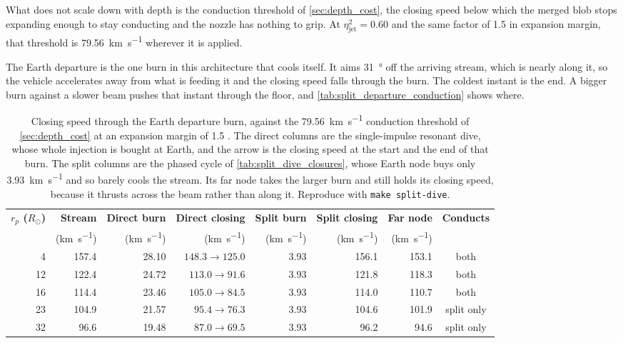 \documentclass{article}
\begin{document}
What does not scale down with depth is the conduction threshold of \autoref{sec:depth_cost}, the closing speed below which the merged blob stops expanding enough to stay conducting and the nozzle has nothing to grip. At $\eta_{\mathrm{jet}}^2 = 0.60$ and the same factor of 1.5 in expansion margin, that threshold is \SI{79.56}{\kilo\meter\per\second} wherever it is applied.

The Earth departure is the one burn in this architecture that cools itself. It aims \SI{31}{\degree} off the arriving stream, which is nearly along it, so the vehicle accelerates away from what is feeding it and the closing speed falls through the burn. The coldest instant is the end. A bigger burn against a slower beam pushes that instant through the floor, and \autoref{tab:split_departure_conduction} shows where.

\begin{table}[!htpb]
    \centering
    \caption{Closing speed through the Earth departure burn, against the \SI{79.56}{\kilo\meter\per\second} conduction threshold of \autoref{sec:depth_cost} at an expansion margin of 1.5 \cite{Katz_aim_is_all_you_need_2025}. The direct columns are the single-impulse resonant dive, whose whole injection is bought at Earth, and the arrow is the closing speed at the start and the end of that burn. The split columns are the phased cycle of \autoref{tab:split_dive_closures}, whose Earth node buys only \SI{3.93}{\kilo\meter\per\second} and so barely cools the stream. Its far node takes the larger burn and still holds its closing speed, because it thrusts across the beam rather than along it. Reproduce with \texttt{make split-dive}.}
    \label{tab:split_departure_conduction}
    \begin{tabular}{|r|r|r|r|r|r|r|c|}\hline
        \textbf{$r_p$ ($R_\odot$)} & \textbf{Stream} & \textbf{Direct burn} & \textbf{Direct closing} & \textbf{Split burn} & \textbf{Split closing} & \textbf{Far node} & \textbf{Conducts} \\
        & (\si{\kilo\meter\per\second}) & (\si{\kilo\meter\per\second}) & (\si{\kilo\meter\per\second}) & (\si{\kilo\meter\per\second}) & (\si{\kilo\meter\per\second}) & (\si{\kilo\meter\per\second}) & \\\hline
        4 & 157.4 & 28.10 & $148.3 \rightarrow 125.0$ & 3.93 & 156.1 & 153.1 & both \\\hline
        12 & 122.4 & 24.72 & $113.0 \rightarrow 91.6$ & 3.93 & 121.8 & 118.3 & both \\\hline
        16 & 114.4 & 23.46 & $105.0 \rightarrow 84.5$ & 3.93 & 114.0 & 110.7 & both \\\hline
        23 & 104.9 & 21.57 & $95.4 \rightarrow \mathbf{76.3}$ & 3.93 & 104.6 & 101.9 & split only \\\hline
        32 & 96.6 & 19.48 & $87.0 \rightarrow \mathbf{69.5}$ & 3.93 & 96.2 & 94.6 & split only \\\hline
    \end{tabular}
\end{table}
\end{document}
